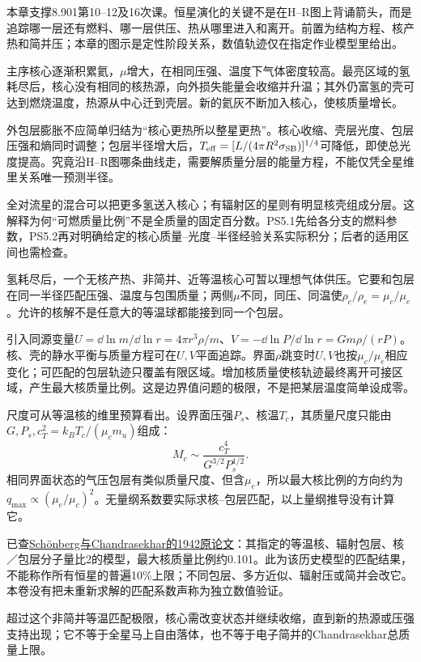 本章支撑8.901第10--12及16次课。恒星演化的关键不是在H--R图上背诵箭头，而是追踪哪一层还有燃料、哪一层供压、热从哪里进入和离开。前置为结构方程、核产热和简并压；本章的图示是定性阶段关系，数值轨迹仅在指定作业模型里给出。

主序核心逐渐积累氦，$\mu$增大，在相同压强、温度下气体密度较高。最亮区域的氢耗尽后，核心没有相同的核热源，向外损失能量会收缩并升温；其外仍富氢的壳可达到燃烧温度，热源从中心迁到壳层。新的氦灰不断加入核心，使核质量增长。

外包层膨胀不应简单归结为“核心更热所以整星更热”。核心收缩、壳层光度、包层压强和熵同时调整；包层半径增大后，$T_{\rm eff}=[L/(4\pi R^2\sigma_{\rm SB})]^{1/4}$可降低，即使总光度提高。究竟沿H--R图哪条曲线走，需要解质量分层的能量方程，不能仅凭全星维里关系唯一预测半径。

全对流星的混合可以把更多氢送入核心；有辐射区的星则有明显核壳组成分层。这解释为何“可燃质量比例”不是全质量的固定百分数。PS5.1先给各分支的燃料参数，PS5.2再对明确给定的核心质量--光度--半径经验关系实际积分；后者的适用区间也需检查。

氢耗尽后，一个无核产热、非简并、近等温核心可暂以理想气体供压。它要和包层在同一半径匹配压强、温度与包围质量；两侧$\mu$不同，同压、同温使$\rho_c/\rho_e=\mu_c/\mu_e$。允许的核解不是任意大的等温球都能接到同一个包层。

引入同源变量$U=\dd\ln m/\dd\ln r=4\pi r^3\rho/m$、$V=-\dd\ln P/\dd\ln r=Gm\rho/(rP)$。核、壳的静水平衡与质量方程可在$U,V$平面追踪。界面$\rho$跳变时$U,V$也按$\mu_c/\mu_e$相应变化；可匹配的包层轨迹只覆盖有限区域。增加核质量使核轨迹最终离开可接区域，产生最大核质量比例。这是边界值问题的极限，不是把某层温度简单设成零。

尺度可从等温核的维里预算看出。设界面压强$P_s$、核温$T_c$，其质量尺度只能由$G,P_s,c_T^2=k_BT_c/(\mu_cm_u)$组成：
\[
 M_c\sim\frac{c_T^4}{G^{3/2}P_s^{1/2}}.
\]
相同界面状态的气压包层有类似质量尺度、但含$\mu_e$，所以最大核比例的方向约为$q_{\max}\propto(\mu_e/\mu_c)^2$。无量纲系数要实际求核--包层匹配，以上量纲推导没有计算它。

已查\href{https://articles.adsabs.harvard.edu/pdf/1942ApJ....96..161S}{Schönberg与Chandrasekhar的1942原论文}：其指定的等温核、辐射包层、核／包层分子量比2的模型，最大核质量比例约0.101。此为该历史模型的匹配结果，不能称作所有恒星的普遍10\%上限；不同包层、多方近似、辐射压或简并会改它。本卷没有把未重新求解的匹配系数声称为独立数值验证。

超过这个非简并等温匹配极限，核心需改变状态并继续收缩，直到新的热源或压强支持出现；它不等于全星马上自由落体，也不等于电子简并的Chandrasekhar总质量上限。

